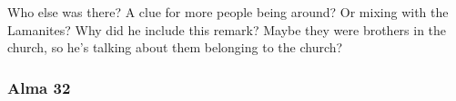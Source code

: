 		\begin{compactdesc}

		\item[35$\vert$]
		\begin{compactdesc}
		\item[many of them are our brethren] Who else was there? A clue for more people being around? Or mixing with the Lamanites? Why did he include this remark? Maybe they were brothers in the church, so he's talking about them belonging to the church?
		\end{compactdesc}

		\end{compactdesc}

	\subsubsection{Alma 32} %

